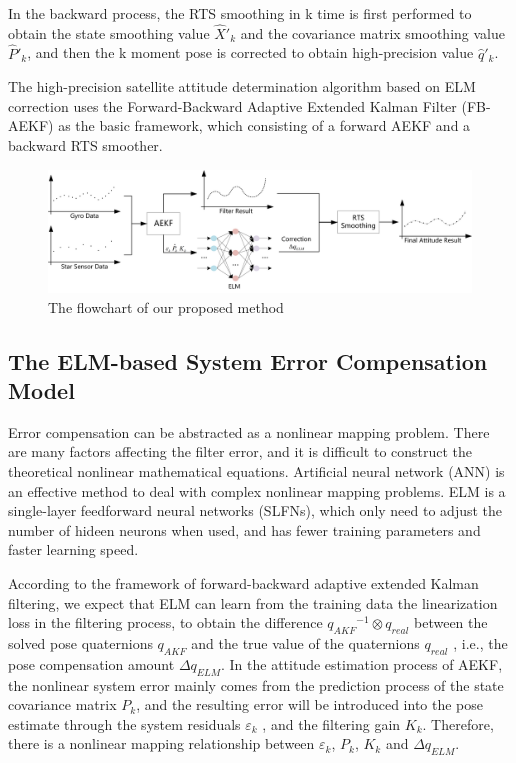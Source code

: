 \documentclass{article}
\begin{document}
	In the backward process, the RTS smoothing in k time is first performed to obtain the state smoothing value $ {\hat X'_k} $ and the covariance matrix smoothing value $ {\hat P'_k} $, and then the k moment pose is corrected to obtain high-precision value $ {\hat q'_k} $.
	
	The high-precision satellite attitude determination algorithm based on ELM correction uses the Forward-Backward Adaptive Extended Kalman Filter (FB-AEKF) as the basic framework, which consisting of a forward AEKF and a backward RTS smoother.
	
	\begin{figure}[h]
		\centering
		\includegraphics[width=\linewidth]{pic/flowchart1.png}
		\caption{The flowchart of our proposed method}
		\label{fig:flowchart}
	\end{figure}
	
	\subsection{The ELM-based System Error Compensation Model}
	\label{sec:2.2.2}
	Error compensation can be abstracted as a nonlinear mapping problem. There are many factors affecting the filter error, and it is difficult to construct the theoretical nonlinear mathematical equations. Artificial neural network (ANN) is an effective method to deal with complex nonlinear mapping problems. ELM is a single-layer feedforward neural networks (SLFNs), which only need to adjust the number of hideen neurons when used, and has fewer training parameters and faster learning speed\cite{huang2011extreme}. 
	
	According to the framework of forward-backward adaptive extended Kalman filtering, we expect that ELM can learn from the training data the linearization loss in the filtering process, to obtain the difference $ {q_{AKF}}^{ - 1} \otimes {q_{real}} $ between the solved pose quaternions $ {q_{AKF}} $ and the true value of the quaternions $ {q_{real}} $ , i.e., the pose compensation amount $ \Delta {q_{ELM}} $. In the attitude estimation process of AEKF, the nonlinear system error mainly comes from the prediction process of the state covariance matrix $ {P_k} $, and the resulting error will be introduced into the pose estimate through the system residuals ${\varepsilon _k}$ , and the filtering gain $ {K_k} $. Therefore, there is a nonlinear mapping relationship between ${\varepsilon _k}$, $ {P_k} $, $ {K_k} $ and $ \Delta {q_{ELM}} $.
	
\end{document}
